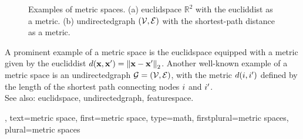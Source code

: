 {{\begin{figure}[H]
		\caption{Examples of \gls{metric} spaces. (a) \gls{euclidspace} $\mathbb{R}^2$ with 
			the \gls{eucliddist} as a \gls{metric}. (b) \Gls{undirectedgraph} $\left( \mathcal{V},\mathcal{E} \right)$ with 
			the shortest-path \gls{distance} as a \gls{metric}.\label{fig:metric_space_examples_dict}}
	    	\end{figure}
		A prominent example of a \gls{metric} space 
		is the \gls{euclidspace} equipped with a \gls{metric} given by the \gls{eucliddist} 
		$\metric{\featurevec}{\featurevec'} = \normgeneric{\featurevec - \featurevec'}{2}$. 
		Another well-known example of a \gls{metric} space is an \gls{undirectedgraph}  
        		$\mathcal{G}=\left( \mathcal{V},\mathcal{E} \right)$, with the \gls{metric} $d(i,i')$ 
		defined by the length of the shortest path connecting nodes $i$ and $i'$. 
			\\
		See also: \gls{euclidspace}, \gls{undirectedgraph}, \gls{featurespace}. },
    	text={metric space}, 
	first={metric space}, 
	type=math, 
	firstplural={metric spaces}, 
	plural={metric spaces}
}

